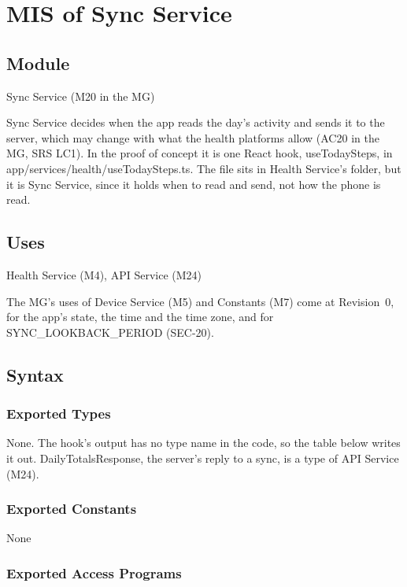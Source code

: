 \documentclass[12pt, titlepage]{article}
\begin{document}
\newpage

\section{MIS of Sync Service} \label{MisSync}

\subsection{Module}

Sync Service (M20 in the MG)

\medskip
\noindent Sync Service decides when the app reads the day's activity and sends
it to the server, which may change with what the health platforms allow (AC20
in the MG, SRS LC1). In the proof of concept it is one React hook,
useTodaySteps, in app/services/health/\allowbreak useTodaySteps.ts. The file
sits in Health Service's folder, but it is Sync Service, since it holds when to
read and send, not how the phone is read.

\subsection{Uses}

Health Service (M4), API Service (M24)

\medskip
\noindent The MG's uses of Device Service (M5) and Constants (M7) come at
Revision~0, for the app's state, the time and the time zone, and for
SYNC\_LOOKBACK\_PERIOD (SEC-20).

\subsection{Syntax}

\subsubsection{Exported Types}

None. The hook's output has no type name in the code, so the table below
writes it out. DailyTotalsResponse, the server's reply to a sync, is a type of
API Service (M24).

\subsubsection{Exported Constants}

None

\subsubsection{Exported Access Programs}
\end{document}

